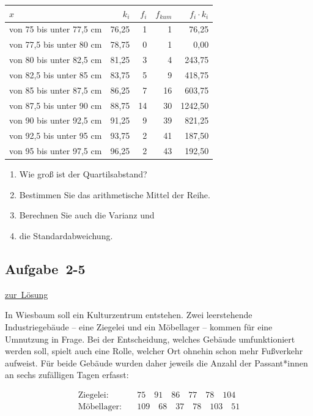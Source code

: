 \documentclass[
  11pt,
  ngerman,
  a4paper,
]{report}
\providecommand{\tightlist}{%
  \setlength{\itemsep}{0pt}\setlength{\parskip}{0pt}}
\begin{document}
\begin{table}[H]
\centering
\begin{tabular}{lrrrr}
\toprule
$x$ & $k_i$ & $f_i$ & $f_{kum}$ & $f_i \cdot k_i$\\
\midrule
von 75 bis unter 77,5 cm & 76,25 & 1 & 1 & 76,25\\
von 77,5 bis unter 80 cm & 78,75 & 0 & 1 & 0,00\\
von 80 bis unter 82,5 cm & 81,25 & 3 & 4 & 243,75\\
von 82,5 bis unter 85 cm & 83,75 & 5 & 9 & 418,75\\
von 85 bis unter 87,5 cm & 86,25 & 7 & 16 & 603,75\\
von 87,5 bis unter 90 cm & 88,75 & 14 & 30 & 1242,50\\
von 90 bis unter 92,5 cm & 91,25 & 9 & 39 & 821,25\\
von 92,5 bis unter 95 cm & 93,75 & 2 & 41 & 187,50\\
von 95 bis unter 97,5 cm & 96,25 & 2 & 43 & 192,50\\
\bottomrule
\end{tabular}
\end{table}

\begin{enumerate}
\def\labelenumi{\alph{enumi})}
\tightlist
\item
  Wie groß ist der Quartilsabstand?
\item
  Bestimmen Sie das arithmetische Mittel der Reihe.
\item
  Berechnen Sie auch die Varianz und
\item
  die Standardabweichung.
\end{enumerate}

\hypertarget{aufgabe-2-5}{%
\subsection{Aufgabe~2-5}\label{aufgabe-2-5}}

\protect\hyperlink{loesung-2-5}{zur~Lösung}

In Wiesbaum soll ein Kulturzentrum entstehen. Zwei leerstehende Industriegebäude -- eine Ziegelei und ein Möbellager -- kommen für eine Umnutzung in Frage. Bei der Entscheidung, welches Gebäude umfunktioniert werden soll, spielt auch eine Rolle, welcher Ort ohnehin schon mehr Fußverkehr aufweist. Für beide Gebäude wurden daher jeweils die Anzahl der Passant*innen an sechs zufälligen Tagen erfasst:

\[\begin{aligned}
\textrm{Ziegelei}: \quad & 75\quad91\quad86\quad77\quad78\quad104\\
\textrm{Möbellager}: \quad & 109\quad68\quad37\quad78\quad103\quad51\\
\end{aligned}\]
\end{document}
